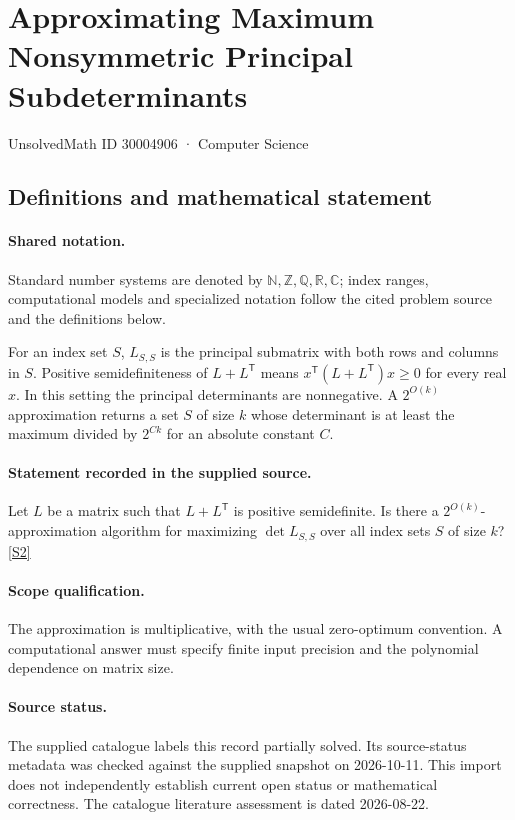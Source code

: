 \documentclass[11pt]{article}
\newcommand{\sref}[2]{\hyperlink{source:#1:#2}{[S#2]}}
\begin{document}
\setcounter{section}{30004905}
\section{Approximating Maximum Nonsymmetric Principal Subdeterminants}\label{30004906}
{\small\sffamily UnsolvedMath ID 30004906 · Computer Science}
\subsection{Definitions and mathematical statement}

\paragraph{Shared notation.}Standard number systems are denoted by $\mathbb N,\mathbb Z,\mathbb Q,\mathbb R,\mathbb C$; index ranges, computational models and specialized notation follow the cited problem source and the definitions below.


For an index set $S$, $L_{S,S}$ is the principal submatrix with both rows and columns in $S$. Positive semidefiniteness of $L+L^{\mathsf T}$ means $x^{\mathsf T}(L+L^{\mathsf T})x\geq0$ for every real $x$. In this setting the principal determinants are nonnegative. A $2^{O(k)}$ approximation returns a set $S$ of size $k$ whose determinant is at least the maximum divided by $2^{Ck}$ for an absolute constant $C$.
\paragraph{Statement recorded in the supplied source.}
Let $L$ be a matrix such that $L+L^\mathsf T$ is positive semidefinite. Is there a $2^{O(k)}$-approximation algorithm for maximizing $\det L_{S,S}$ over all index sets $S$ of size $k$? \sref{30004906}{2}
\paragraph{Scope qualification.}
The approximation is multiplicative, with the usual zero-optimum convention. A computational answer must specify finite input precision and the polynomial dependence on matrix size.
\paragraph{Source status.}
The supplied catalogue labels this record partially solved. Its source-status metadata was checked against the supplied snapshot on 2026-10-11. This import does not independently establish current open status or mathematical correctness. The catalogue literature assessment is dated 2026-08-22.
\end{document}
